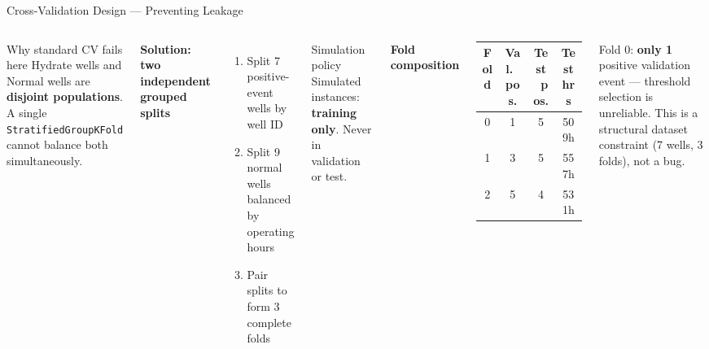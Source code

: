 \documentclass[aspectratio=169,10pt]{beamer}
\begin{document}
\begin{frame}{Cross-Validation Design — Preventing Leakage}
  \begin{columns}
      \begin{block}{Why standard CV fails here}
        Hydrate wells and Normal wells are \textbf{disjoint populations}.\\
        A single \texttt{StratifiedGroupKFold} cannot balance both simultaneously.
      \end{block}
      \textbf{Solution: two independent grouped splits}
      \begin{enumerate}
        \item Split 7 positive-event wells by well ID
        \item Split 9 normal wells balanced by operating hours
        \item Pair splits to form 3 complete folds
      \end{enumerate}
      \begin{alertblock}{Simulation policy}
        Simulated instances: \textbf{training only}. Never in validation or test.
      \end{alertblock}
      \textbf{Fold composition}
      \begin{table}
        \begin{tabular}{cccc}
          \toprule
          Fold & Val.~pos. & Test~pos. & Test hrs \\
          \midrule
          0 & 1 & 5 & 509h \\
          1 & 3 & 5 & 557h \\
          2 & 5 & 4 & 531h \\
          \bottomrule
        \end{tabular}
      \end{table}
      \vspace{0.4em}
      \small Fold 0: \textbf{only 1} positive validation event — threshold selection is unreliable. This is a structural dataset constraint (7 wells, 3 folds), not a bug.
  \end{columns}
\end{frame}
\end{document}
